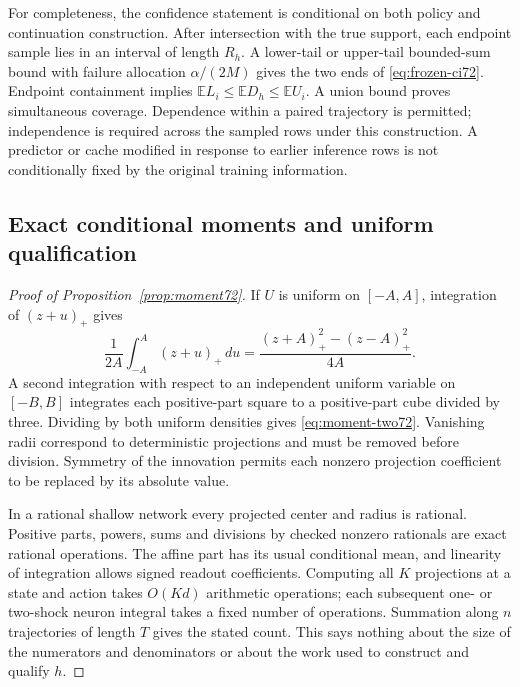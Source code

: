 For completeness, the confidence statement is conditional on both policy and continuation construction. After intersection with the true support, each endpoint sample lies in an interval of length $R_h$. A lower-tail or upper-tail bounded-sum bound with failure allocation $\alpha/(2M)$ gives the two ends of \eqref{eq:frozen-ci72}. Endpoint containment implies $\mathbb E L_i\le\mathbb E D_h\le\mathbb E U_i$. A union bound proves simultaneous coverage. Dependence within a paired trajectory is permitted; independence is required across the sampled rows under this construction. A predictor or cache modified in response to earlier inference rows is not conditionally fixed by the original training information.

\subsection{Exact conditional moments and uniform qualification}\label{supp:moments72}
\begin{proof}[Proof of Proposition~\ref{prop:moment72}]
If $U$ is uniform on $[-A,A]$, integration of $(z+u)_+$ gives
\[
 \frac1{2A}\int_{-A}^A(z+u)_+\,du
 =\frac{(z+A)_+^2-(z-A)_+^2}{4A}.
\]
A second integration with respect to an independent uniform variable on $[-B,B]$ integrates each positive-part square to a positive-part cube divided by three. Dividing by both uniform densities gives \eqref{eq:moment-two72}. Vanishing radii correspond to deterministic projections and must be removed before division. Symmetry of the innovation permits each nonzero projection coefficient to be replaced by its absolute value.

In a rational shallow network every projected center and radius is rational. Positive parts, powers, sums and divisions by checked nonzero rationals are exact rational operations. The affine part has its usual conditional mean, and linearity of integration allows signed readout coefficients. Computing all $K$ projections at a state and action takes $O(Kd)$ arithmetic operations; each subsequent one- or two-shock neuron integral takes a fixed number of operations. Summation along $n$ trajectories of length $T$ gives the stated count. This says nothing about the size of the numerators and denominators or about the work used to construct and qualify $h$.
\end{proof}

